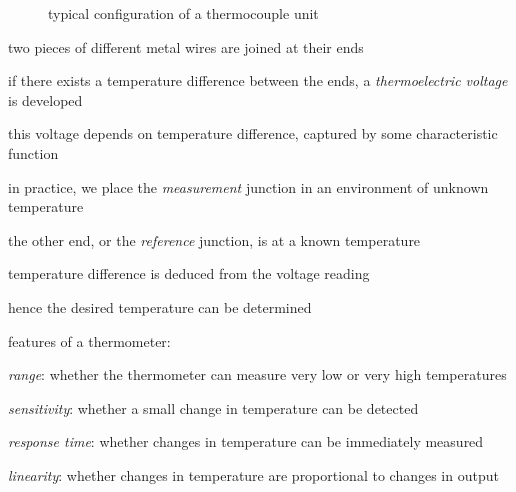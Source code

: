 \documentclass[a4paper,12pt]{book}
\newcommand{\cmt}{}
\newcommand{\cmt}{}
\begin{document}
\begin{figure}[ht]
	\centering
	
	\caption{typical configuration of a thermocouple unit}
\end{figure}

two pieces of different metal wires are joined at their ends

if there exists a temperature difference between the ends, a \emph{thermoelectric voltage} is developed

this voltage depends on temperature difference, captured by some characteristic function

in practice, we place the \emph{measurement} junction in an environment of unknown temperature

the other end, or the \emph{reference} junction, is at a known temperature

temperature difference is deduced from the voltage reading

hence the desired temperature can be determined

\vspace*{\baselineskip}

\cmt features of a thermometer:
\begin{compactitem}
	\item[--] \emph{range}: whether the thermometer can measure very low or very high temperatures
	
	\item[--] \emph{sensitivity}: whether a small change in temperature can be detected
	
	\item[--] \emph{response time}: whether changes in temperature can be immediately measured
	
	\item[--] \emph{linearity}: whether changes in temperature are proportional to changes in output
	
\end{compactitem}
\end{document}

